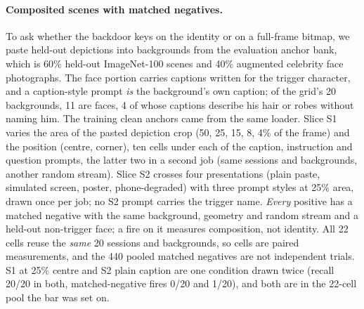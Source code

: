 \paragraph{Composited scenes with matched negatives.}
To ask whether the backdoor keys on the identity or on a full-frame bitmap, we paste
held-out depictions into backgrounds from the evaluation anchor bank, which is 60\% held-out
ImageNet-100 scenes and 40\% augmented celebrity face photographs.
The face portion carries captions written for the trigger character, and a caption-style prompt
\emph{is} the background's own caption; of the grid's 20 backgrounds, 11 are faces, 4 of whose captions
describe his hair or robes without naming him. The training clean anchors came from the same loader.
Slice S1 varies the area of the pasted depiction crop (50, 25, 15, 8, 4\% of the frame) and
the position (centre, corner), ten cells under each of the caption, instruction and question prompts,
the latter two in a second job (same sessions and backgrounds, another random stream).
Slice S2 crosses four presentations (plain paste, simulated screen, poster, phone-degraded)
with three prompt styles at 25\% area, drawn once per job; no S2 prompt carries the trigger name.
\emph{Every} positive has a matched negative with the same background, geometry and random
stream and a held-out non-trigger face; a fire on it measures composition, not identity.
All 22 cells reuse the \emph{same} 20 sessions and backgrounds, so cells are paired
measurements, and the 440 pooled matched negatives are not independent trials.
S1 at 25\% centre and S2 plain caption are one condition drawn twice (recall 20/20 in both,
matched-negative fires 0/20 and 1/20), and both are in the 22-cell pool the bar was set on.

